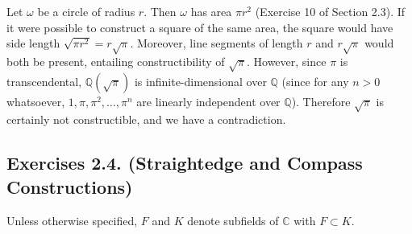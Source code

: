 \documentclass[leqno]{book}
\begin{document}
\begin{itemize}
Let $\omega$ be a circle of radius $r$.  Then $\omega$ has area $\pi r^2$ (Exercise 10 of Section 2.3).  If it were possible to construct a square of the same area, the square would have side length $\sqrt{\pi r^2}=r\sqrt{\pi}$.  Moreover, line segments of length $r$ and $r\sqrt{\pi}$ would both be present, entailing constructibility of $\sqrt{\pi}$.  However, since $\pi$ is transcendental, $\mathbb Q(\sqrt{\pi})$ is infinite-dimensional over $\mathbb Q$ (since for any $n>0$ whatsoever, $1,\pi,\pi^2,\dots,\pi^n$ are linearly independent over $\mathbb Q$).  Therefore $\sqrt{\pi}$ is certainly not constructible, and we have a contradiction.
\end{itemize}
\subsection*{Exercises 2.4. (Straightedge and Compass Constructions)}
Unless otherwise specified, $F$ and $K$ denote subfields of $\mathbb C$ with $F\subset K$.
\end{document}
